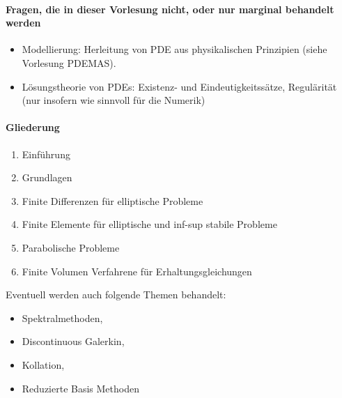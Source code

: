 \paragraph{Fragen, die in dieser Vorlesung nicht, oder nur marginal behandelt werden}

\begin{itemize}
	\item
		Modellierung: Herleitung von PDE aus physikalischen Prinzipien (siehe Vorlesung PDEMAS).
	\item
		Lösungstheorie von PDEs: Existenz- und Eindeutigkeitssätze, Regulärität (nur insofern wie sinnvoll für die Numerik)
\end{itemize}

\paragraph{Gliederung}

\begin{enumerate}[1.,start=0]
	\item
		Einführung
	\item
		Grundlagen
	\item
		Finite Differenzen für elliptische Probleme
	\item
		Finite Elemente für elliptische und inf-sup stabile Probleme
	\item
		Parabolische Probleme
	\item
		Finite Volumen Verfahrene für Erhaltungsgleichungen
\end{enumerate}

Eventuell werden auch folgende Themen behandelt:
\begin{itemize}
	\item
		Spektralmethoden,
	\item
		Discontinuous Galerkin,
	\item
		Kollation,
	\item
		Reduzierte Basis Methoden
\end{itemize}

